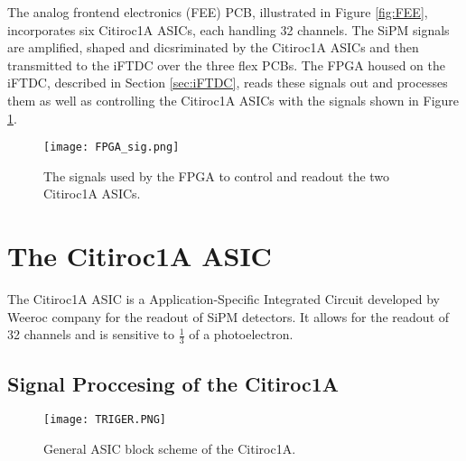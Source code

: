 The analog frontend electronics (FEE) PCB, illustrated in Figure \ref{fig:FEE}, incorporates six Citiroc1A ASICs, each handling 32 channels.
The SiPM signals are amplified, shaped and dicsriminated by the Citiroc1A ASICs  and then transmitted to the iFTDC over the three flex PCBs.
\newline
The FPGA housed on the iFTDC, described in Section \ref{sec:iFTDC},
reads these signals out and processes them as well as controlling the Citiroc1A ASICs with the signals shown in Figure \ref{fig:FPGA_sigs}.\autocite{InternalcommunicationIgor}
\begin{figure}[H]
    \centering
    \texttt{[image: FPGA\_sig.png]}
    \caption{The signals used by the FPGA to control and readout the two Citiroc1A ASICs.\autocite{datasheetCITIROC}}
    \label{fig:FPGA_sigs}
\end{figure}


\section{The Citiroc1A ASIC}
The Citiroc1A ASIC is a Application-Specific Integrated Circuit developed by Weeroc company for the readout of SiPM detectors.
It allows for the readout of 32 channels and is sensitive to $\frac{1}{3}$ of a photoelectron.\autocite{datasheetCITIROC}
\subsection{Signal Proccesing of the Citiroc1A}
\begin{figure}[h]
    \centering
    \texttt{[image: TRIGER.PNG]}
    \caption{General ASIC block scheme of the Citiroc1A.\autocite{datasheetCITIROC}}
    \label{fig:CITIROC1A_TRIGEER}
\end{figure}

